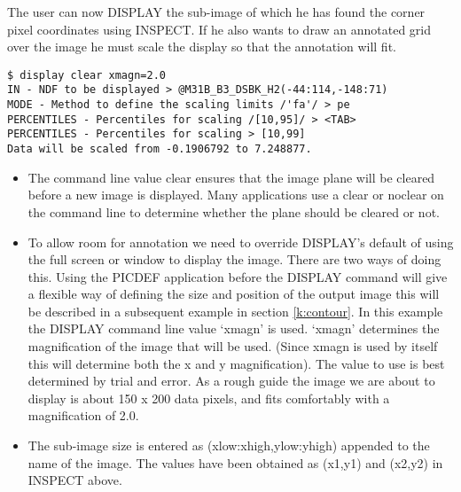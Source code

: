 \documentclass[twoside,11pt]{article}
\begin{document}
The user can now DISPLAY the sub-image of which he has found the corner pixel
coordinates using INSPECT. If he also wants to draw an annotated grid over 
the image he must scale the display so that the annotation will fit.
\begin{small}
\begin{verbatim}
$ display clear xmagn=2.0
IN - NDF to be displayed > @M31B_B3_DSBK_H2(-44:114,-148:71)
MODE - Method to define the scaling limits /'fa'/ > pe
PERCENTILES - Percentiles for scaling /[10,95]/ > <TAB>
PERCENTILES - Percentiles for scaling > [10,99]
Data will be scaled from -0.1906792 to 7.248877.
\end{verbatim}
\end{small}

\begin{itemize}
\item The command line value clear ensures that the image plane will be 
cleared before a new image is displayed. Many applications use a clear or 
noclear on the command line to determine whether the plane should be 
cleared or not.
\item To allow room for annotation we need to override DISPLAY's default of
using the full screen or window to display the image. There are two ways of
doing this. Using the PICDEF application before the DISPLAY command will give a
flexible way of defining the size and position of the output image this will be
described in a subsequent example in section \ref{k:contour}. In this example
the DISPLAY command line value `xmagn' is used.  `xmagn' determines the
magnification of the image that will be used. (Since xmagn is used by itself
this will determine both the x and y magnification). The value to use is best
determined by trial and error. As a rough guide the image we are about to
display is about 150 x 200 data pixels, and fits comfortably with a
magnification of 2.0.
\item The sub-image size is entered as (xlow:xhigh,ylow:yhigh) appended to  
the name of the image. The values have been obtained as (x1,y1) and (x2,y2) in
INSPECT above. 
\end{itemize}
\end{document}
